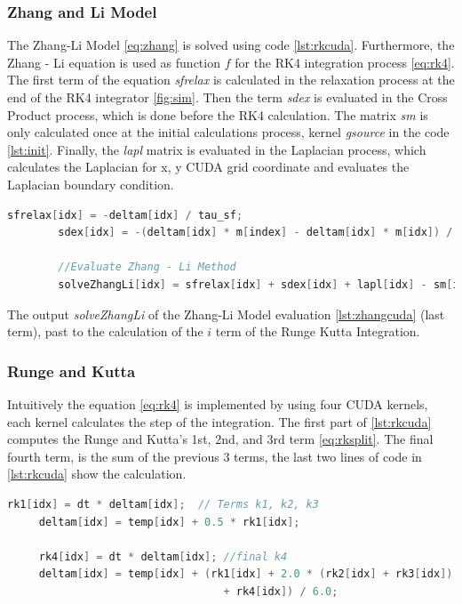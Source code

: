 \subsubsection{Zhang and Li Model}

The Zhang-Li Model \ref{eq:zhang} is solved using code \ref{lst:rkcuda}. Furthermore, the Zhang - Li equation is used as function $f$ for the RK4 integration process \ref{eq:rk4}. The first term of the equation \textit{sfrelax} is calculated in the relaxation process at the end of the RK4 integrator \ref{fig:sim}. Then the term \textit{sdex} is evaluated in the Cross Product process, which is done before the RK4 calculation. The matrix \textit{sm} is only calculated once at the initial calculations process, kernel \textit{gsource} in the code \ref{lst:init}. Finally, the \textit{lapl} matrix is evaluated in the Laplacian process, which calculates the Laplacian for x, y CUDA grid coordinate and evaluates the Laplacian boundary condition.

\begin{lstlisting}[language=C++, label={lst:zhangcuda}, caption={Runge and Kutta 4th Terms}]
		sfrelax[idx] = -deltam[idx] / tau_sf;
		sdex[idx] = -(deltam[idx] * m[index] - deltam[idx] * m[idx]) / tau_sd;
		
		//Evaluate Zhang - Li Method
        solveZhangLi[idx] = sfrelax[idx] + sdex[idx] + lapl[idx] - sm[idx];
\end{lstlisting}

The output  \textit{solveZhangLi} of the Zhang-Li Model evaluation \ref{lst:zhangcuda}  (last term), past to the calculation of the $i$ term of the Runge Kutta Integration.

\subsubsection{Runge and Kutta}
 
Intuitively the equation \ref{eq:rk4} is implemented by using four CUDA kernels, each kernel calculates the step of the integration. The first part of \ref{lst:rkcuda} computes the Runge and Kutta's 1st, 2nd, and 3rd  term \ref{eq:rksplit}. The final fourth term, is the sum of the previous 3 terms, the last two lines of code in \ref{lst:rkcuda} show the calculation.

\begin{lstlisting}[language=C++, label={lst:rkcuda}, caption={Runge and Kutta 4th Terms}]
     rk1[idx] = dt * deltam[idx];  // Terms k1, k2, k3
     deltam[idx] = temp[idx] + 0.5 * rk1[idx];
     
     rk4[idx] = dt * deltam[idx]; //final k4
     deltam[idx] = temp[idx] + (rk1[idx] + 2.0 * (rk2[idx] + rk3[idx])
                                  + rk4[idx]) / 6.0;
\end{lstlisting}


